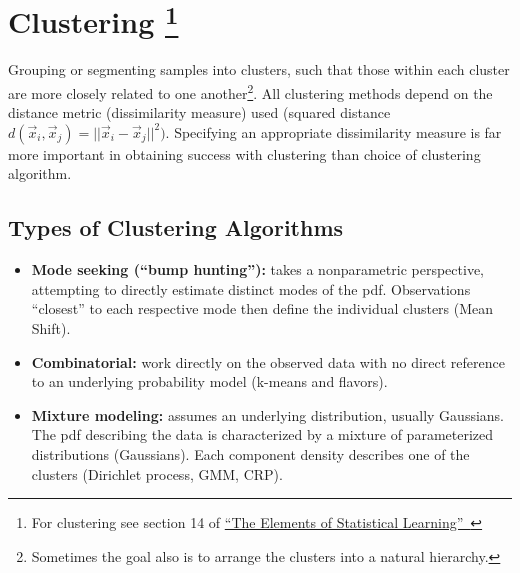 
\section[Clustering]{Clustering \footnote{For clustering see section 14 of \href{https://web.stanford.edu/~hastie/ElemStatLearn/}{``The Elements of Statistical Learning''~\cite{elements}}}}%
Grouping or segmenting samples into clusters, such that those within each cluster are more closely related to one another\footnote{Sometimes the goal also is to arrange the clusters into a natural hierarchy.}. All clustering methods depend on the distance metric (dissimilarity measure) used (\eg squared distance \(d(\vec{x}_i, \vec{x}_j) = ||\vec{x}_i - \vec{x}_j||^2)\). Specifying an appropriate dissimilarity measure is far more important in obtaining success with clustering than choice of clustering algorithm.

\subsection{Types of Clustering Algorithms}
\begin{itemize}
    \item \textbf{Mode seeking (``bump hunting''):} takes a nonparametric perspective, attempting to directly estimate distinct modes of the pdf. Observations ``closest'' to each respective mode then define the individual clusters (Mean Shift).
    \item \textbf{Combinatorial:} work directly on the observed data with no direct reference to an underlying probability model (k-means and flavors).
    \item \textbf{Mixture modeling:} assumes an underlying distribution, usually Gaussians. The pdf describing the data is characterized by a mixture of parameterized distributions (Gaussians). Each component density describes one of the clusters (Dirichlet process, GMM, CRP).
\end{itemize}
